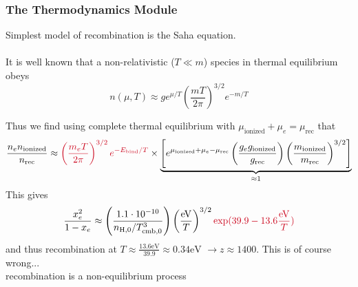 \begin{frame}[fragile]
	\frametitle{The Thermodynamics Module}
	
	Simplest model of {\Red recombination} is the {\Red Saha equation}.\\ \mbox{}\\ 
	
	It is well known that a non-relativistic ($T \ll m$) species in thermal equilibrium obeys
	\begin{equation}
		n(\mu,T) \approx g e^{\mu/T} \left(\frac{m T}{2 \pi}\right)^{3/2} e^{-m/T}
	\end{equation}
	
	Thus we find using {\Red complete thermal equilibrium} with $\mu_\mathrm{ionized} + \mu_e = \mu_\mathrm{rec}$ that
	\begin{equation*}
		\frac{n_e n_\mathrm{ionized}}{n_\mathrm{rec}} \approx {\Red \left(\frac{m_e T}{2\pi}\right)^{3/2} e^{-E_\mathrm{bind}/T}} \times \underbrace{\left[ e^{\mu_\mathrm{ionized} + \mu_e - \mu_\mathrm{rec}} \left(\frac{g_e g_\mathrm{ionized}}{g_\mathrm{rec}}\right) \left(\frac{m_\mathrm{ionized}}{m_\mathrm{rec}}\right)^{3/2}\right]}_{\approx 1}
	\end{equation*}
	\vspace*{-2\baselineskip}
	This gives
	\begin{equation}
		\frac{x_e^2}{1-x_e} \approx \left(\frac{1.1 \cdot 10^{-10}}{n_\mathrm{H,0} /T_\mathrm{cmb,0}^3}\right) \left(\frac{\mathrm{eV}}{T}\right)^{3/2} {\Red \exp(39.9 - 13.6 \frac{\mathrm{eV}}{T})}
	\end{equation}
	and thus recombination at $T \approx \frac{13.6\mathrm{eV}}{39.9} \approx 0.34\mathrm{eV}$ $\to z \approx 1400$. \pause This is of course wrong...\\ \pause
	{\Red recombination is a non-equilibrium process}
\end{frame}


